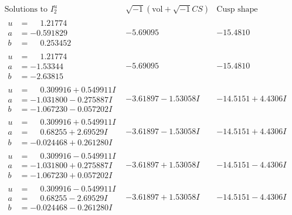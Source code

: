 \documentclass[1p]{elsarticle_modified}
\theoremstyle{definition}
\newcommand{\I}{\sqrt{-1}}
\begin{document}
$$\begin{array}{c|c|c}  
\text{Solutions to }I^u_{2}& \I (\text{vol} + \sqrt{-1}CS) & \text{Cusp shape}\\
 \hline 
\begin{aligned}
u &= \phantom{-}1.21774\phantom{ +0.000000I} \\
a &= -0.591829\phantom{ +0.000000I} \\
b &= \phantom{-}0.253452\phantom{ +0.000000I}\end{aligned}
 & -5.69095\phantom{ +0.000000I} & -15.4810\phantom{ +0.000000I} \\ \hline\begin{aligned}
u &= \phantom{-}1.21774\phantom{ +0.000000I} \\
a &= -1.53344\phantom{ +0.000000I} \\
b &= -2.63815\phantom{ +0.000000I}\end{aligned}
 & -5.69095\phantom{ +0.000000I} & -15.4810\phantom{ +0.000000I} \\ \hline\begin{aligned}
u &= \phantom{-}0.309916 + 0.549911 I \\
a &= -1.031800 - 0.275887 I \\
b &= -1.067230 - 0.057202 I\end{aligned}
 & -3.61897 - 1.53058 I & -14.5151 + 4.4306 I \\ \hline\begin{aligned}
u &= \phantom{-}0.309916 + 0.549911 I \\
a &= \phantom{-}0.68255 + 2.69529 I \\
b &= -0.024468 + 0.261280 I\end{aligned}
 & -3.61897 - 1.53058 I & -14.5151 + 4.4306 I \\ \hline\begin{aligned}
u &= \phantom{-}0.309916 - 0.549911 I \\
a &= -1.031800 + 0.275887 I \\
b &= -1.067230 + 0.057202 I\end{aligned}
 & -3.61897 + 1.53058 I & -14.5151 - 4.4306 I \\ \hline\begin{aligned}
u &= \phantom{-}0.309916 - 0.549911 I \\
a &= \phantom{-}0.68255 - 2.69529 I \\
b &= -0.024468 - 0.261280 I\end{aligned}
 & -3.61897 + 1.53058 I & -14.5151 - 4.4306 I \\ \hline\begin{aligned}

\end{aligned}
\end{array}$$
\end{document}
